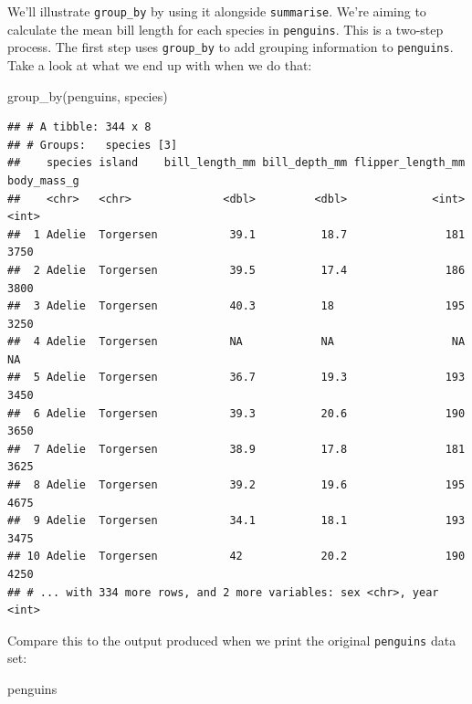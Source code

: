 \documentclass[
]{book}
\newenvironment{Shaded}{\begin{snugshade}}{\end{snugshade}}
\newcommand{\FunctionTok}[1]{\textcolor[rgb]{0.00,0.00,0.00}{#1}}
\newcommand{\NormalTok}[1]{#1}
\begin{document}
We'll illustrate \texttt{group\_by} by using it alongside \texttt{summarise}. We're aiming to calculate the mean bill length for each species in \texttt{penguins}. This is a two-step process. The first step uses \texttt{group\_by} to add grouping information to \texttt{penguins}. Take a look at what we end up with when we do that:

\begin{Shaded}
\begin{Highlighting}[]
\FunctionTok{group\_by}\NormalTok{(penguins, species)}
\end{Highlighting}
\end{Shaded}

\begin{verbatim}
## # A tibble: 344 x 8
## # Groups:   species [3]
##    species island    bill_length_mm bill_depth_mm flipper_length_mm body_mass_g
##    <chr>   <chr>              <dbl>         <dbl>             <int>       <int>
##  1 Adelie  Torgersen           39.1          18.7               181        3750
##  2 Adelie  Torgersen           39.5          17.4               186        3800
##  3 Adelie  Torgersen           40.3          18                 195        3250
##  4 Adelie  Torgersen           NA            NA                  NA          NA
##  5 Adelie  Torgersen           36.7          19.3               193        3450
##  6 Adelie  Torgersen           39.3          20.6               190        3650
##  7 Adelie  Torgersen           38.9          17.8               181        3625
##  8 Adelie  Torgersen           39.2          19.6               195        4675
##  9 Adelie  Torgersen           34.1          18.1               193        3475
## 10 Adelie  Torgersen           42            20.2               190        4250
## # ... with 334 more rows, and 2 more variables: sex <chr>, year <int>
\end{verbatim}

Compare this to the output produced when we print the original \texttt{penguins} data set:

\begin{Shaded}
\begin{Highlighting}[]
\NormalTok{penguins}
\end{Highlighting}
\end{Shaded}
\end{document}
